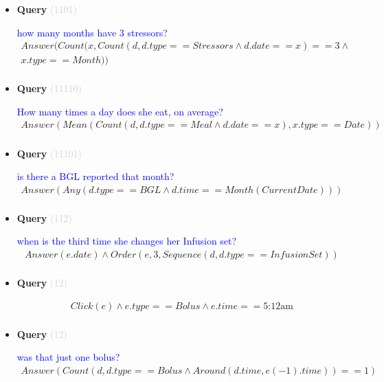 \documentclass[11pt]{article}
\newcommand{\key}[1]{\textcolor{lightgray}{#1}}
\newcounter{CQuery}
\begin{document}
\begin{itemize}
\item
\textbf{Query\theCQuery} \key{(1101)} \addtocounter{CQuery}{1}
\textcolor{blue}{ how many months have 3 stressors? }
\begin{multline*}
Answer(Count(x, Count(d, d.type==Stressors \wedge d.date==x)==3 \wedge \\ 
x.type==Month)) \\ 
\end{multline*}


\item
\textbf{Query\theCQuery} \key{(11110)} \addtocounter{CQuery}{1}
\textcolor{blue}{ How many times a day does she eat, on average? }
\begin{multline*}
Answer(Mean(Count(d, d.type==Meal \wedge d.date==x), x.type==Date)) \\ 
\end{multline*}


\item
\textbf{Query\theCQuery} \key{(11101)} \addtocounter{CQuery}{1}
\textcolor{blue}{ is there a BGL reported that month? }
\begin{multline*}
Answer(Any(d.type==BGL \wedge d.time==Month(CurrentDate))) \\ 
\end{multline*}


\item
\textbf{Query\theCQuery} \key{(112)} \addtocounter{CQuery}{1}
\textcolor{blue}{ when is the third time she changes her Infusion set? }
\begin{multline*}
Answer(e.date) \wedge Order(e, 3, Sequence(d, d.type==InfusionSet)) \\ 
\end{multline*}


\item
\textbf{Query\theCQuery} \key{(12)} \addtocounter{CQuery}{1}
\textcolor{blue}{  }
\begin{multline*}
Click(e) \wedge e.type == Bolus \wedge e.time==\mbox{5:12am} \\ 
\end{multline*}


\item
\textbf{Query\theCQuery} \key{(12)} \addtocounter{CQuery}{1}
\textcolor{blue}{ was that just one bolus? }
\begin{multline*}
Answer(Count(d, d.type==Bolus \wedge Around(d.time, e(-1).time))==1) \\ 
\end{multline*}



\end{itemize}
\end{document}
